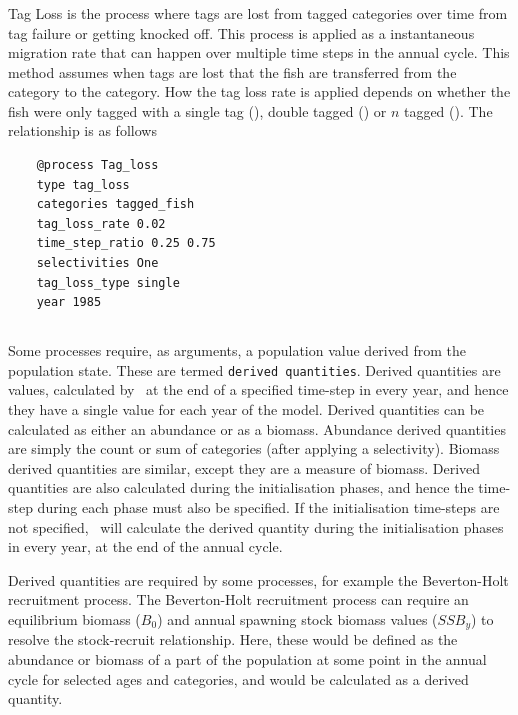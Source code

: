 \subsubsection{}

Tag Loss is the process where tags are lost from tagged categories over time from tag failure or getting knocked off. This process is applied as a instantaneous migration rate that can happen over multiple time steps in the annual cycle. This method assumes when tags are lost that the fish are transferred from the  category to the  category. How the tag loss rate is applied depends on whether the fish were only tagged with a single tag (), double tagged () or $n$ tagged (). The relationship is as follows

{\small{\begin{verbatim}
	@process Tag_loss
	type tag_loss
	categories tagged_fish
	tag_loss_rate 0.02
	time_step_ratio 0.25 0.75
	selectivities One
	tag_loss_type single
	year 1985
		\end{verbatim}}}

\subsection{\label{sec:derived-quantities}}

Some processes require, as arguments, a population value derived from the population state. These are termed \texttt{derived quantities}. Derived quantities are values, calculated by \CNAME\ at the end of a specified time-step in every year, and hence they have a single value for each year of the model. Derived quantities can be calculated as either an abundance or as a biomass. Abundance derived quantities are simply the count or sum of categories (after applying a selectivity). Biomass derived quantities are similar, except they are a measure of biomass. Derived quantities are also calculated during the initialisation phases, and hence the time-step during each phase must also be specified. If the initialisation time-steps are not specified, \CNAME\ will calculate the derived quantity during the initialisation phases in every year, at the end of the annual cycle. 

Derived quantities are required by some processes, for example the Beverton-Holt recruitment process. The Beverton-Holt recruitment process can require an equilibrium biomass ($B_0$) and annual spawning stock biomass values ($SSB_y$) to resolve the stock-recruit relationship. Here, these would be defined as the abundance or biomass of a part of the population at some point in the annual cycle for selected ages and categories, and would be calculated as a derived quantity.

